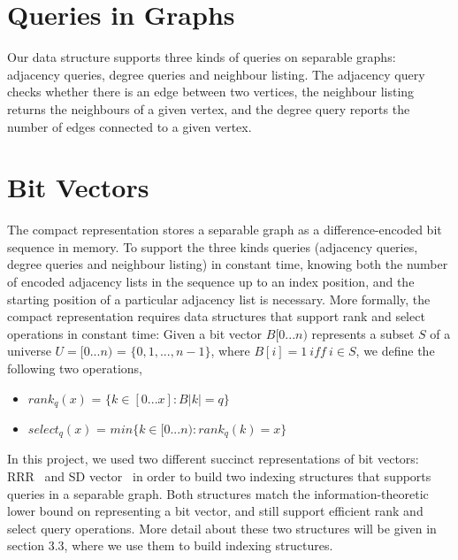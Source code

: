 \documentclass[12pt,glossary]{dalthesis}
\begin{document}
\section{Queries in Graphs}
Our data structure supports three kinds of queries on separable graphs: adjacency queries, degree queries and neighbour listing. The adjacency query checks whether there is an edge between two vertices, the neighbour listing returns the neighbours of a given vertex, and the degree query reports the number of edges connected to a given vertex.

\bigskip
\bigskip

\section{Bit Vectors}
The compact representation stores a separable graph as a difference-encoded bit sequence in memory. To support the three kinds queries (adjacency queries, degree queries and neighbour listing) in constant time, knowing both the number of encoded adjacency lists in the sequence up to an index position, and the starting position of a particular adjacency list is necessary. More formally, the compact representation requires data structures that support rank and select operations in constant time: Given a bit vector $B[0...n)$ represents a subset $S$ of a universe $U = [0...n)$ = $\{0,1,...,n-1 \}$, where $B[i] = 1 \ iff \ i \in S$, we define the following two operations, 

\begin{itemize}[noitemsep]
\item $rank_{q}(x)$ = $\{k \in [0...x] : B|k| = q \}$
\item $select_{q}(x)$ = $ min \{ k \in [0...n) : rank_{q}(k) = x \} $ 
\end{itemize}


In this project, we used two different succinct representations of bit vectors: RRR~\cite{RRR} and SD vector~\cite{SD-vector} in order to build two indexing structures that supports queries in a separable graph. Both structures match the information-theoretic lower bound on representing a bit vector, and still support efficient rank and select query operations. More detail about these two structures will be given in section 3.3, where we use them to build indexing structures.

\bigskip
\bigskip
\end{document}
